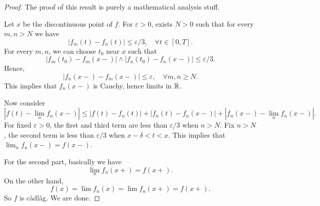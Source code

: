 \documentclass[8pt,onesided]{article}
\begin{document}
\begin{proof}
The proof of this result is purely a mathematical analysis stuff.

Let $x$ be the discontinuous point of $f$. For $\varepsilon>0$, exists $N>0$ such that for every $m,n>N$ we have
\begin{equation*}
    |f_m(t)-f_n(t)|\le \varepsilon/3, \quad \forall t\in [0,T].
\end{equation*}
For every $m, n$, we can choose $t_0$ near $x$ such that
\begin{equation*}
    |f_m(t_0)-f_m(x-)|\wedge |f_n(t_0)-f_n(x-)|\le \varepsilon/3.
\end{equation*}
Hence,
\begin{equation*} 
    |f_n(x-)-f_m(x-)|\le \varepsilon,\quad \forall m,n \ge N.
\end{equation*}
This implies that $f_n(x-)$ is Cauchy, hence limits in $\mathbb{R}$. 

Now consider
\begin{equation*}
    |f(t)-\lim_n f_n(x-)|\le |f(t)-f_n(t)|+|f_n(t)-f_n(x-)|+|f_n(x-)-\lim_n f_n(x-)|.
\end{equation*}
For fixed $\varepsilon>0$, the first and third term are less than $\varepsilon/3$ when $n>N$. Fix $n>N$, the second term is less than $\varepsilon/3$ when $x-\delta<t<x$. This implies that $\lim_n f_n(x-)=f(x-)$. 

For the second part, basically we have
\begin{equation*}
    \lim_n f_n(x+)=f(x+).
\end{equation*}
On the other hand,
\begin{equation*}
    f(x)=\lim f_n(x)= \lim f_n(x+)=f(x+).
\end{equation*}
So $f$ is càdlàg. We are done. 
\end{proof}


\end{document}

